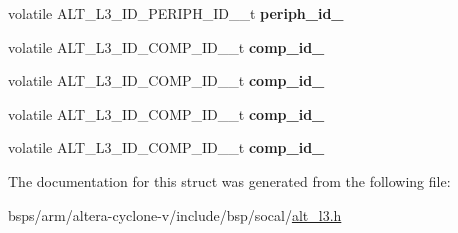 \begin{DoxyCompactItemize}
volatile A\+L\+T\+\_\+\+L3\+\_\+\+I\+D\+\_\+\+P\+E\+R\+I\+P\+H\+\_\+\+I\+D\+\_\+\_\+t {\bfseries periph\+\_\+id\+\_}
\item 
\mbox{\label{structALT__L3__IDGRP__s_a040b9c27ec169f2043c5ccf74093ae2d}} 
volatile A\+L\+T\+\_\+\+L3\+\_\+\+I\+D\+\_\+\+C\+O\+M\+P\+\_\+\+I\+D\+\_\+\_\+t {\bfseries comp\+\_\+id\+\_}
\item 
\mbox{\label{structALT__L3__IDGRP__s_aa061d3d955386939cee2938342b6c85b}} 
volatile A\+L\+T\+\_\+\+L3\+\_\+\+I\+D\+\_\+\+C\+O\+M\+P\+\_\+\+I\+D\+\_\+\_\+t {\bfseries comp\+\_\+id\+\_}
\item 
\mbox{\label{structALT__L3__IDGRP__s_ae65cbe4d5a8989cfe6365b34ce9b5e45}} 
volatile A\+L\+T\+\_\+\+L3\+\_\+\+I\+D\+\_\+\+C\+O\+M\+P\+\_\+\+I\+D\+\_\+\_\+t {\bfseries comp\+\_\+id\+\_}
\item 
\mbox{\label{structALT__L3__IDGRP__s_aec58d925884602dfe5004044f0c1e17f}} 
volatile A\+L\+T\+\_\+\+L3\+\_\+\+I\+D\+\_\+\+C\+O\+M\+P\+\_\+\+I\+D\+\_\+\_\+t {\bfseries comp\+\_\+id\+\_}
\end{DoxyCompactItemize}


The documentation for this struct was generated from the following file\+:\begin{DoxyCompactItemize}
\item 
bsps/arm/altera-\/cyclone-\/v/include/bsp/socal/\mbox{\hyperlink{alt__l3_8h}{alt\+\_\+l3.\+h}}\end{DoxyCompactItemize}
